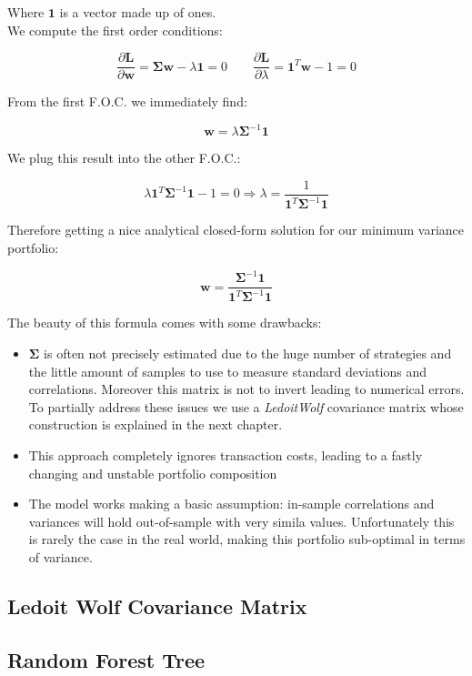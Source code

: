 \documentclass[12pt]{article} %
\numberwithin{equation}{subsection}
\begin{document}
Where $\mathbf{1}$ is a vector made up of ones.\\
We compute the first order conditions:

$$
\frac{\partial \mathbf{L}}{\partial \mathbf{w}} = \mathbf{\Sigma} \mathbf{w} - \lambda\mathbf{1} = 0 \qquad  \frac{\partial \mathbf{L}}{\partial \lambda} = \mathbf{1}^T\mathbf{w} - 1 = 0
$$

From the first F.O.C. we immediately find:

$$
\mathbf{w} = \lambda \mathbf{\Sigma}^{-1} \mathbf{1}
$$

We plug this result into the other F.O.C.:

$$
\lambda \mathbf{1}^T \mathbf{\Sigma}^{-1} \mathbf{1} - 1 = 0 \Longrightarrow \lambda = \frac{1}{\mathbf{1}^T \mathbf{\Sigma}^{-1} \mathbf{1}}
$$

Therefore getting a nice analytical closed-form solution for our minimum variance portfolio:

$$
\mathbf{w} = \frac{\mathbf{\Sigma}^{-1} \mathbf{1}}{\mathbf{1}^T \mathbf{\Sigma}^{-1} \mathbf{1}}
$$

The beauty of this formula comes with some drawbacks:
\begin{itemize}
	\item $\mathbf{\Sigma}$ is often not precisely estimated due to the huge number of strategies and the little amount of samples to use to measure standard deviations and correlations. Moreover this matrix is not to invert leading to numerical errors. To partially address these issues we use a \textit{LedoitWolf} covariance matrix whose construction is explained in the next chapter.
	\item This approach completely ignores transaction costs, leading to a fastly changing and unstable portfolio composition
	\item The model works making a basic assumption: in-sample correlations and variances will hold out-of-sample with very simila values. Unfortunately this is rarely the case in the real world, making this portfolio sub-optimal in terms of variance.
\end{itemize}

\subsection*{Ledoit Wolf Covariance Matrix}

\subsection*{Random Forest Tree}
\end{document}
